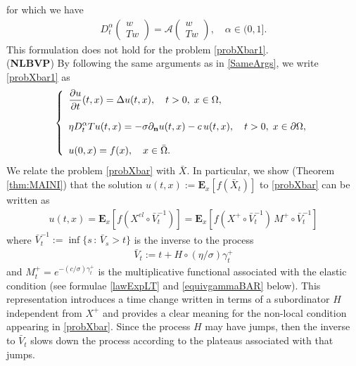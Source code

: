 \documentclass[11pt,a4paper]{article}
\begin{document}
for which we have
\begin{align*}
D^\alpha_t \left( \begin{array}{c} w\\ Tw \end{array} \right) = \mathcal{A} \left( \begin{array}{c} w\\ Tw \end{array} \right), \quad \alpha \in (0,1].
\end{align*}
This formulation does not hold for the problem \eqref{probXbar1}.\\


({\bf NLBVP}) By following the same arguments as in \eqref{SameArgs}, we write \eqref{probXbar1} as 
\begin{align}
\left\lbrace
\begin{array}{l}
\displaystyle \frac{\partial u}{\partial t}(t,x) = \Delta u(t,x), \quad t>0, \; x \in \Omega, \\
\\
\displaystyle \eta D^\alpha_t Tu(t,x) = - \sigma \partial_{\bf n} u(t,x) - c \, u(t,x), \quad t>0, \; x \in \partial \Omega,\\
\\
\displaystyle u(0,x) = f(x), \quad x \in \bar{\Omega}.
\end{array}
\right .
\label{probXbar}
\end{align}
We relate the problem \eqref{probXbar} with $\bar{X}$. In particular, we show (Theorem \ref{thm:MAINI}) that the solution $u(t,x) := \mathbf{E}_x[f(\bar{X}_t)]$ to \eqref{probXbar} can be written as 
\begin{align*}
u(t,x) = \mathbf{E}_x[f(X^{el} \circ \bar{V}^{-1}_t)] = \mathbf{E}_x [f(X^+ \circ \bar{V}^{-1}_t) \, M^+ \circ \bar{V}^{-1}_t]
\end{align*}
where $\bar{V}^{-1}_t := \inf\{ s \, :\, \bar{V}_s > t\}$ is the inverse to the process
\begin{align}
\label{Vbar}
\bar{V}_t := t +  H \circ (\eta/\sigma) \gamma^+_t
\end{align}
and $M^+_t = e^{-(c/\sigma) \gamma^+_t}$ is the multiplicative functional associated with the elastic condition (see formulae \eqref{lawExpLT} and \eqref{equivgammaBAR} below). This representation introduces a time change written in terms of a subordinator $H$ independent from $X^+$ and provides a clear meaning for the non-local condition appearing in \eqref{probXbar}. Since the process $H$ may have jumps, then the inverse to $\bar{V}_t$ slows down the process according to the plateaus associated with that jumps.  \\
\end{document}
